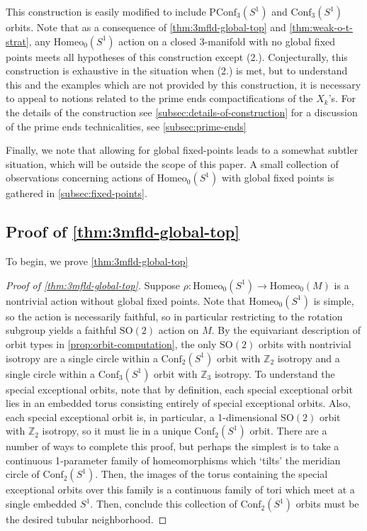 \documentclass[10pt, oneside]{article}
\newcommand{\Z}{\mathbb{Z}}
\newcommand{\SO}[1][2]{\text{SO}(#1)}
\newcommand{\homeo}[1][S^1]{\text{Homeo}_0(#1)}
\newcommand{\conf}[2][S^1]{\text{Conf}_{#2}(#1)}
\newcommand{\pconf}[2][S^1]{\text{PConf}_{#2}(#1)}
\theoremstyle{definition}
\theoremstyle{definition}
\begin{document}
This construction is easily modified to include $\pconf[S^1]{3}$ and $\conf[S^1]{3}$ orbits.
Note that as a consequence of \cref{thm:3mfld-global-top} and \cref{thm:weak-o-t-strat}, any $\homeo$ action on a closed 3-manifold with no global fixed points meets all hypotheses of this construction except (2.). Conjecturally, this construction is exhaustive in the situation when (2.) is met, but to understand this and the examples which are not provided by this construction, it is necessary to appeal to notions related to the prime ends compactifications of the $X_k$'s. For the details of the construction see \cref{subsec:details-of-construction} for a discussion of the prime ends technicalities, see \cref{subsec:prime-ends}

Finally, we note that allowing for global fixed-points leads to a somewhat subtler situation, which will be outside the scope of this paper. A small collection of observations concerning actions of $\homeo$ with global fixed points is gathered in \cref{subsec:fixed-points}.

\subsection{Proof of \texorpdfstring{\cref{thm:3mfld-global-top}}{Theorem \ref*{thm:3mfld-global-top}}}
To begin, we prove \cref{thm:3mfld-global-top}
\begin{proof}[Proof of  \cref{thm:3mfld-global-top}]
    Suppose $\rho: \homeo \to \homeo[M]$ is a nontrivial action without global fixed points. Note that $\homeo$ is simple, so the action is necessarily faithful, so in particular restricting to the rotation subgroup yields a faithful $\text{SO}(2)$ action on $M$. By the equivariant description of orbit types in \cref{prop:orbit-computation}, the only $\text{SO}(2)$ orbits with nontrivial isotropy are a single circle within a $\conf[S^1]{2}$ orbit with $\Z_2$ isotropy and a single circle within a $\conf[S^1]{3}$ orbit with $\Z_3$ isotropy. To understand the special exceptional orbits, note that by definition, each special exceptional orbit lies in an embedded torus consisting entirely of special exceptional orbits. Also, each special exceptional orbit is, in particular, a 1-dimensional $\SO[2]$ orbit with $\Z_2$ isotropy, so it must lie in a unique $\conf[S^1]{2}$ orbit. There are a number of ways to complete this proof, but perhaps the simplest is to take a continuous 1-parameter family of homeomorphisms which `tilts' the meridian circle of $\conf[S^1]{2}$. Then, the images of the torus containing the special exceptional orbits over this family is a continuous family of tori which meet at a single embedded $S^1$. Then, conclude this collection of $\conf[S^1]{2}$ orbits must be the desired tubular neighborhood.
\end{proof}
\end{document}
